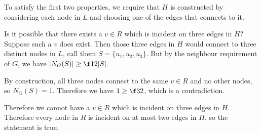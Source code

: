 \documentclass[a4paper]{article}
\begin{document}
To satisfy the first two properties, we require that $H$ is constructed by considering each node in $L$ and choosing one of the edges that connects to it.

Is it possible that there exists a $v \in R$ which is incident on three edges in $H$? Suppose such a $v$ does exist. Then those three edges in $H$ would connect to three distinct nodes in $L$, call them $S = \{u_1, u_2, u_3\}$. But by the neighbour requirement of $G$, we have $|N_G(S)| \ge \f12 |S|$.

By construction, all three nodes connect to the same $v \in R$ and no other nodes, so $N_G(S) = 1$. Therefore we have $1 \ge \f32$, which is a contradiction.

Therefore we cannot have a $v \in R$ which is incident on three edges in $H$. Therefore every node in $R$ is incident on at most two edges in $H$, so the statement is true.

\end{document}
